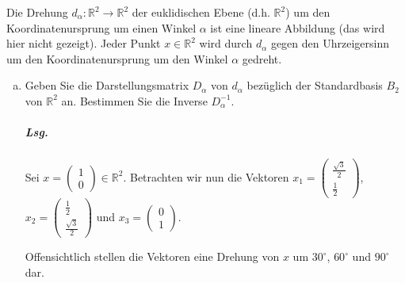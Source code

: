 \documentclass{scrreprt}
\begin{document}
Die Drehung $d_{\alpha} \colon \mathbb{R}^2 \to \mathbb{R}^2$ der euklidischen
Ebene (d.h. $\mathbb{R}^2$) um den Koordinatenursprung um einen Winkel $\alpha$
ist eine lineare Abbildung (das wird hier nicht gezeigt).
Jeder Punkt $x \in \mathbb{R}^2$ wird durch $d_{\alpha}$ gegen den Uhrzeigersinn
um den Koordinatenursprung um den Winkel $\alpha$ gedreht.
\begin{enumerate}[(a)]
\item Geben Sie die Darstellungsmatrix $D_{\alpha}$ von $d_{\alpha}$ bezüglich
  der Standardbasis $B_2$ von $\mathbb{R}^2$ an.
  Bestimmen Sie die Inverse $D_{\alpha}^{-1}$.

  \subparagraph{Lsg.} Sei
  $x = \begin{pmatrix} 1 \\ 0 \end{pmatrix} \in \mathbb{R}^2$.
  Betrachten wir nun die Vektoren
  $x_1 = \begin{pmatrix} \frac{\sqrt{3}}{2} \\ \frac{1}{2} \end{pmatrix}$,
  $x_2 = \begin{pmatrix} \frac{1}{2} \\ \frac{\sqrt{3}}{2} \end{pmatrix}$ und
  $x_3 = \begin{pmatrix} 0 \\ 1 \end{pmatrix}$.


  Offensichtlich stellen die Vektoren eine Drehung von $x$ um $30^{\circ}$,
  $60^{\circ}$ und $90^{\circ}$ dar.


\end{enumerate}
\end{document}
